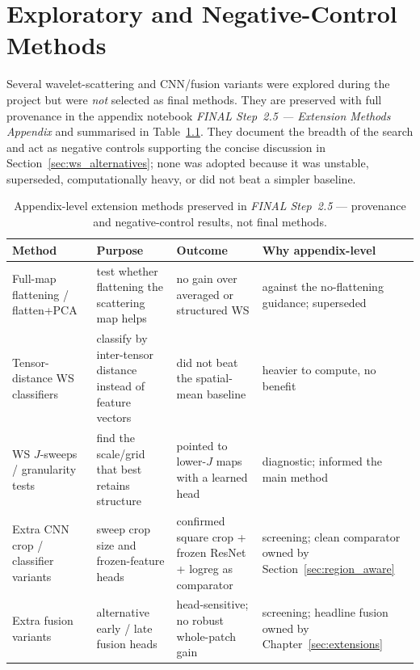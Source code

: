 \chapter{Exploratory and Negative-Control Methods} \label{app:negative_controls}

Several wavelet-scattering and CNN/fusion variants were explored during the project but were \emph{not} selected as final methods. They are preserved with full provenance in the appendix notebook \textit{FINAL Step~2.5 --- Extension Methods Appendix} and summarised in Table~\ref{tab:appendix_methods}. They document the breadth of the search and act as negative controls supporting the concise discussion in Section~\ref{sec:ws_alternatives}; none was adopted because it was unstable, superseded, computationally heavy, or did not beat a simpler baseline.

\begin{table}[h]
\centering
\caption[Appendix --- exploratory and negative-control extension methods (provenance)]{Appendix-level extension methods preserved in \textit{FINAL Step~2.5} --- provenance and negative-control results, not final methods.}
\label{tab:appendix_methods}
\small
\begin{tabular}{p{2.9cm}p{3.3cm}p{2.9cm}p{3.1cm}}
\toprule
\textbf{Method} & \textbf{Purpose} & \textbf{Outcome} & \textbf{Why appendix-level} \\
\midrule
Full-map flattening / flatten+PCA & test whether flattening the scattering map helps & no gain over averaged or structured WS & against the no-flattening guidance; superseded \\
Tensor-distance WS classifiers & classify by inter-tensor distance instead of feature vectors & did not beat the spatial-mean baseline & heavier to compute, no benefit \\
WS $J$-sweeps / granularity tests & find the scale/grid that best retains structure & pointed to lower-$J$ maps with a learned head & diagnostic; informed the main method \\
Extra CNN crop / classifier variants & sweep crop size and frozen-feature heads & confirmed square crop + frozen ResNet + logreg as comparator & screening; clean comparator owned by Section~\ref{sec:region_aware} \\
Extra fusion variants & alternative early / late fusion heads & head-sensitive; no robust whole-patch gain & screening; headline fusion owned by Chapter~\ref{sec:extensions} \\
\bottomrule
\end{tabular}
\end{table}
